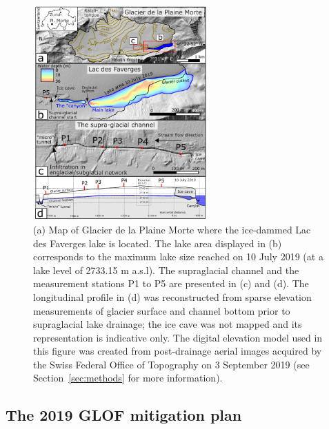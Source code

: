 \begin{figure}[H]
    \centering
    \includegraphics[width=0.6\textwidth]{chapters/chapter_plainemorte/fig01.pdf}
    \caption{(a) Map of Glacier de la Plaine Morte where the
      ice-dammed Lac des Faverges lake is located. The lake area
      displayed in (b) corresponds to the maximum lake size reached on
      10 July 2019 (at a lake level of 2733.15 m a.s.l). The
      supraglacial channel and the measurement stations P1 to P5 are
      presented in (c) and (d). The longitudinal profile in (d) was
      reconstructed from sparse elevation measurements of glacier
      surface and channel bottom prior to supraglacial lake
      drainage; the ice cave was not mapped and its representation is indicative only. The digital elevation model used in this figure was
      created from post-drainage aerial images acquired by the Swiss
      Federal Office of Topography on 3 September 2019 (see
      Section~\ref{sec:methods} for more information).}
    \label{fig:study_area}
\end{figure}

\subsection{The 2019 GLOF mitigation plan}

